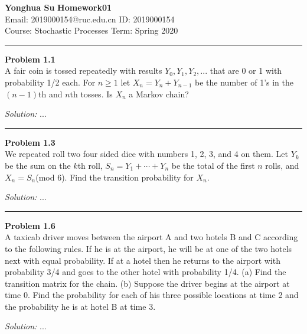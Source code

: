 \documentclass[a4paper, 11pt]{article}
\newenvironment{problem}[2][Problem]
    { \begin{mdframed}[backgroundcolor=gray!20] \textbf{#1 #2} \\}
    {  \end{mdframed}}
\newenvironment{solution}
    {\textit{Solution:}}
    {}
\begin{document}
\noindent
\large\textbf{Yonghua Su} \hfill \textbf{Homework01}   \\
Email: 2019000154@ruc.edu.cn \hfill ID: 2019000154 \\
\normalsize Course: Stochastic Processes \hfill Term: Spring 2020\\
\noindent\rule{7in}{2.8pt}
\begin{problem}{1.1}
    A fair coin is tossed repeatedly with results $ Y_0, Y_1, Y_2, ...$ that are 0 or 1 with probability 1/2 each. For $n\geq1$ let
    $X_n=Y_n+Y_{n-1}$ be the number of 1's in the $(n-1)$th and $n$th tosses. Is $X_n$ a Markov chain?
\end{problem}
\begin{solution}
    ...
\end{solution}

\noindent\rule{7in}{2.8pt}
\begin{problem}{1.3}
    We repeated roll two four sided dice with numbers 1, 2, 3, and 4 on them. Let $Y_k$ be the sum on the $k$th roll, $S_n = Y_1+\cdots+Y_n$ be
    the total of the first $n$ rolls, and $X_n = S_n$(mod 6). Find the transition probability for $X_n$.
\end{problem}
\begin{solution}
...
\end{solution} 
\noindent\rule{7in}{2.8pt}
\begin{problem}{1.6}
    A taxicab driver moves between the airport A and two hotels B and C according to the following rules.
    If he is at the airport, he will be at one of the two hotels next with equal probability. 
    If at a hotel then he returns to the airport with probability 3/4 and goes to the other hotel with probability 1/4.
    (a) Find the transition matrix for the chain. (b) Suppose the driver begins at the airport at time 0. 
    Find the probability for each of his three possible locations at time 2 and the probability he is at hotel B at time 3.
\end{problem}
\begin{solution}
    ...
\end{solution}
\end{document}

